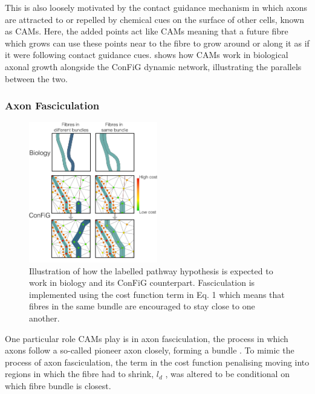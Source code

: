 This is also loosely motivated by the contact guidance mechanism in which axons are attracted to or repelled by chemical cues on the surface of other cells, known as \acp{CAM}. Here, the added points act like \acp{CAM} meaning that a future fibre which grows can use these points near to the fibre to grow around or along it as if it were following contact guidance cues.  shows how \acp{CAM} work in biological axonal growth alongside the \ac{ConFiG} dynamic network, illustrating the parallels between the two.

\subsubsection{Axon Fasciculation}
\label{sec:config_fasciculation}

\begin{figure}
  \centering
  \includegraphics[width=0.5\textwidth]{figures/config/biological_fasciculate.png}
  \caption[Illustraction of the fasciculation process]{Illustration of how the labelled pathway hypothesis is expected to work in biology and its \ac{ConFiG} counterpart. Fasciculation is implemented using the cost function term in Eq. 1 which means that fibres in the same bundle are encouraged to stay close to one another.}
  \label{fig:config_fasciculation}
\end{figure}

One particular role \acp{CAM} play is in axon fasciculation, the process in which axons follow a so-called pioneer axon closely, forming a bundle \cite{Price2017,Sakisaka2005}. To mimic the process of axon fasciculation, the term in the cost function penalising moving into regions in which the fibre had to shrink, $l_d$ , was altered to be conditional on which fibre bundle is closest.

